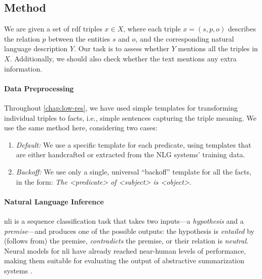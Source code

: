 \subsection{Method}
\label{sec:sem-acc:method}
We are given a set of \acs{rdf} triples $x \in X$, where each triple $x = (s, p, o)$ describes the relation $p$ between the entities $s$ and $o$, and the corresponding natural language description $Y$. Our task is to assess whether $Y$ mentions all the triples in $X$. Additionally, we should also check whether the text mentions any extra information.

\paragraph{Data Preprocessing} Throughout \autoref{chap:low-res}, we have used simple templates for transforming individual triples to facts, i.e., simple sentences capturing the triple meaning.  We use the same method here, considering two cases:
\begin{enumerate}
    \item \emph{Default:} We use a specific template for each predicate, using templates that are either handcrafted or extracted from the NLG systems' training data.
    \item \emph{Backoff:} We use only a single, universal ``backoff'' template for all the facts, in the form: \emph{The \textless{}predicate\textgreater{} of \textless{}subject\textgreater{} is \textless{}object\textgreater{}}.
\end{enumerate}

\paragraph{Natural Language Inference} \ac{nli} is a sequence classification task that takes two inputs---a \textit{hypothesis} and a \textit{premise}---and produces one of the possible outputs: the hypothesis is \textit{entailed} by (follows from) the premise, \textit{contradicts} the premise, or their relation is \textit{neutral}. Neural models for \ac{nli} \cite{zhang2019semantics,liu-etal-2019-multi,liuRoBERTaRobustlyOptimized2019} have already reached near-human levels of performance, making them suitable for evaluating the output of abstractive summarization systems \cite{maynezFaithfulnessFactualityAbstractive2020}.


